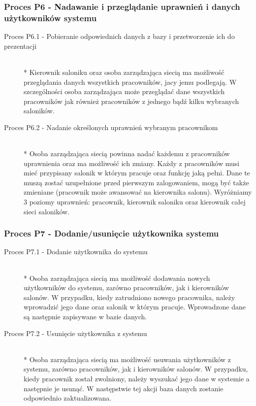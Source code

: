 \subsubsection{Proces P6 - Nadawanie i przeglądanie uprawnień i danych użytkowników systemu}
\begin{description}
\item[Proces P6.1 - Pobieranie odpowiednich danych z bazy i przetworzenie ich do prezentacji] ~\\*
Kierownik saloniku oraz osoba zarządzająca siecią ma możliwość przeglądania danych wszystkich pracowników, jacy jemu podlegają. W szczególności osoba zarządzająca może przeglądać dane wszystkich pracowników jak również pracowników z jednego bądź kilku wybranych saloników.
\item[Proces P6.2 - Nadanie określonych uprawnień wybranym pracownikom] ~\\*
Osoba zarządzająca siecią powinna nadać każdemu z pracowników uprawnienia oraz ma możliwość ich zmiany. Każdy z pracowników musi mieć przypisany salonik w którym pracuje oraz funkcję jaką pełni. Dane te muszą zostać uzupełnione przed pierwszym zalogowaniem, mogą być także zmieniane (pracownik może awansować na kierownika salonu). Wyróżniamy 3 poziomy uprawnień: pracownik, kierownik saloniku oraz kierownik całej sieci saloników.
\end{description}
\subsubsection{Proces P7 - Dodanie/usunięcie użytkownika systemu}
\begin{description}
\item[Proces P7.1 - Dodanie użytkownika do systemu] ~\\*
Osoba zarządzająca siecią ma możliwość dodawania nowych użytkowników do systemu, zarówno pracowników, jak i kierowników salonów. W przypadku, kiedy zatrudniono nowego pracownika, należy wprowadzić jego dane oraz salonik w którym pracuje. Wprowadzone dane są następnie zapisywane w bazie danych.
\item[Proces P7.2 - Usunięcie użytkownika z systemu] ~\\*
Osoba zarządzająca siecią ma możliwość usuwania użytkowników z systemu, zarówno pracowników, jak i kierowników salonów. W przypadku, kiedy pracownik został zwolniony, należy wyszukać jego dane w systemie a następnie je usunąć. W następstwie tej akcji baza danych zostanie odpowiednio zaktualizowana.
\end{description}
